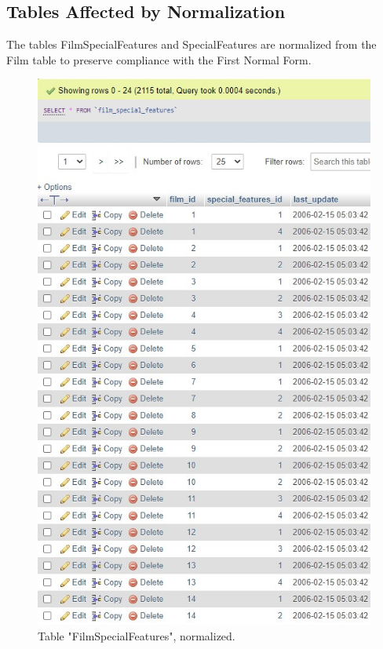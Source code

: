 \documentclass{article}
\begin{document}
	\subsection{Tables Affected by Normalization}
		The tables Film\textunderscore Special\textunderscore Features and Special\textunderscore Features are normalized from the Film table to preserve compliance with the First Normal Form. 
		\begin{figure}[H]
			\includegraphics[width=\textwidth]{table_filmspecialfeatures_norm}
			\caption{Table "Film\textunderscore Special\textunderscore Features", normalized.}
		\end{figure}
\end{document}
